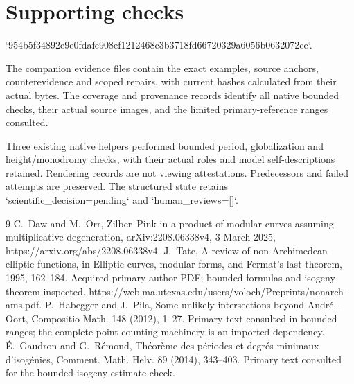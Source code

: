 \documentclass[10pt]{article}
\begin{document}
\section*{Supporting checks}
`954b5f34892e9e0fdafe908ef1212468c3b3718fd66720329a6056b0632072ce`.\par
The companion evidence files contain the exact examples, source anchors, counterevidence and scoped repairs, with current hashes calculated from their actual bytes. The coverage and provenance records identify all native bounded checks, their actual source images, and the limited primary-reference ranges consulted.\par
Three existing native helpers performed bounded period, globalization and height/monodromy checks, with their actual roles and model self-descriptions retained. Rendering records are not viewing attestations. Predecessors and failed attempts are preserved. The structured state retains `scientific\_decision=pending` and `human\_reviews=[]`.\par
9 C. Daw and M. Orr, Zilber–Pink in a product of modular curves assuming multiplicative degeneration, arXiv:2208.06338v4, 3 March 2025, https://arxiv.org/abs/2208.06338v4. J. Tate, A review of non-Archimedean elliptic functions, in Elliptic curves, modular forms, and Fermat’s last theorem, 1995, 162–184. Acquired primary author PDF; bounded formulas and isogeny theorem inspected. https://web.ma.utexas.edu/users/voloch/Preprints/nonarch-ams.pdf. P. Habegger and J. Pila, Some unlikely intersections beyond André–Oort, Compositio Math. 148 (2012), 1–27. Primary text consulted in bounded ranges; the complete point-counting machinery is an imported dependency. É. Gaudron and G. Rémond, Théorème des périodes et degrés minimaux d’isogénies, Comment. Math. Helv. 89 (2014), 343–403. Primary text consulted for the bounded isogeny-estimate check.\par
\end{document}
